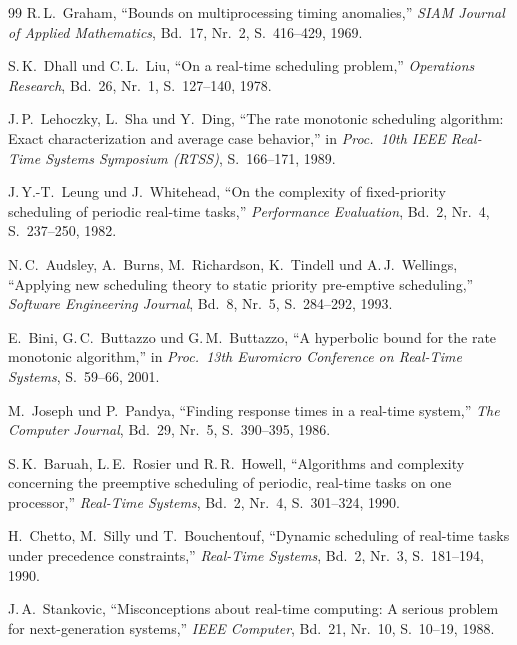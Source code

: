 ﻿\documentclass[a4paper,12pt]{report}
\theoremstyle{definition}
\begin{document}
\begin{thebibliography}{99}
R.\,L.\ Graham,
``Bounds on multiprocessing timing anomalies,''
\textit{SIAM Journal of Applied Mathematics}, Bd.~17, Nr.~2, S.~416--429, 1969.

S.\,K.\ Dhall und C.\,L.\ Liu,
``On a real-time scheduling problem,''
\textit{Operations Research}, Bd.~26, Nr.~1, S.~127--140, 1978.


J.\,P.\ Lehoczky, L.\ Sha und Y.\ Ding,
``The rate monotonic scheduling algorithm: Exact characterization and
average case behavior,''
in \textit{Proc.\ 10th IEEE Real-Time Systems Symposium (RTSS)},
S.~166--171, 1989.

J.\,Y.-T.\ Leung und J.\ Whitehead,
``On the complexity of fixed-priority scheduling of periodic real-time tasks,''
\textit{Performance Evaluation}, Bd.~2, Nr.~4, S.~237--250, 1982.

N.\,C.\ Audsley, A.\ Burns, M.\ Richardson, K.\ Tindell und A.\,J.\ Wellings,
``Applying new scheduling theory to static priority pre-emptive scheduling,''
\textit{Software Engineering Journal}, Bd.~8, Nr.~5, S.~284--292, 1993.

E.\ Bini, G.\,C.\ Buttazzo und G.\,M.\ Buttazzo,
``A hyperbolic bound for the rate monotonic algorithm,''
in \textit{Proc.\ 13th Euromicro Conference on Real-Time Systems},
S.~59--66, 2001.

M.\ Joseph und P.\ Pandya,
``Finding response times in a real-time system,''
\textit{The Computer Journal}, Bd.~29, Nr.~5, S.~390--395, 1986.


S.\,K.\ Baruah, L.\,E.\ Rosier und R.\,R.\ Howell,
``Algorithms and complexity concerning the preemptive scheduling of
periodic, real-time tasks on one processor,''
\textit{Real-Time Systems}, Bd.~2, Nr.~4, S.~301--324, 1990.

H.\ Chetto, M.\ Silly und T.\ Bouchentouf,
``Dynamic scheduling of real-time tasks under precedence constraints,''
\textit{Real-Time Systems}, Bd.~2, Nr.~3, S.~181--194, 1990.

J.\,A.\ Stankovic,
``Misconceptions about real-time computing: A serious problem for
next-generation systems,''
\textit{IEEE Computer}, Bd.~21, Nr.~10, S.~10--19, 1988.


\end{thebibliography}
\end{document}
